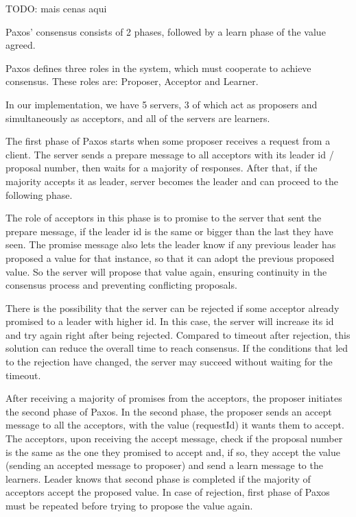 \documentclass[times, 10pt,twocolumn]{article}
\begin{document}
TODO: mais cenas aqui

Paxos' consensus consists of 2 phases,
followed by a learn phase of the value agreed.


Paxos defines three roles in the system, which must cooperate to achieve
consensus. These roles are: Proposer, Acceptor and Learner.

In our implementation, we have 5 servers, 3 of which act as proposers and
simultaneously as acceptors, and all of the servers are learners. 


The first phase of Paxos starts when some proposer receives a request
from a client. The server sends a prepare message to all acceptors with
its leader id / proposal number, then waits for a majority of responses. After that,
if the majority accepts it as leader, server becomes the leader and
can proceed to the following phase.

The role of acceptors in this phase is to promise to the server
that sent the prepare message, if the leader id is the same or
bigger than the last they have seen. The promise message also lets the
leader know if any previous leader has proposed a value
for that instance, so that it can adopt the previous proposed value.
So the server will propose that value again, ensuring continuity
in the consensus process and preventing conflicting proposals.

There is the possibility that the server can be rejected if
some acceptor already promised to a leader with higher id.
In this case, the server will increase its id and try again right
after being rejected. Compared to timeout after rejection,
this solution can reduce the overall time to reach consensus.
If the conditions that led to the rejection have changed,
the server may succeed without waiting for the timeout.


After receiving a majority of promises from the acceptors, the proposer 
initiates the second phase of Paxos. In the second phase, the proposer 
sends an accept message to all the acceptors, with the value (requestId) 
it wants them to accept. The acceptors, upon receiving the accept message,
check if the proposal number is the same as the one they promised to accept
and, if so, they accept the value (sending an accepted message to proposer)
and send a learn message to the learners.
Leader knows that second phase is completed if the majority of acceptors
accept the proposed value. In case of rejection, first phase of Paxos must
be repeated before trying to propose the value again.
\end{document}
